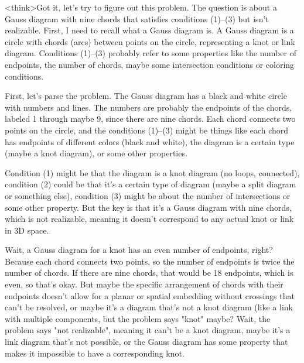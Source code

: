 <think>Got it, let's try to figure out this problem. The question is about a Gauss diagram with nine chords that satisfies conditions (1)--(3) but isn't realizable. First, I need to recall what a Gauss diagram is. A Gauss diagram is a circle with chords (arcs) between points on the circle, representing a knot or link diagram. Conditions (1)--(3) probably refer to some properties like the number of endpoints, the number of chords, maybe some intersection conditions or coloring conditions.

First, let's parse the problem. The Gauss diagram has a black and white circle with numbers and lines. The numbers are probably the endpoints of the chords, labeled 1 through maybe 9, since there are nine chords. Each chord connects two points on the circle, and the conditions (1)--(3) might be things like each chord has endpoints of different colors (black and white), the diagram is a certain type (maybe a knot diagram), or some other properties.

Condition (1) might be that the diagram is a knot diagram (no loops, connected), condition (2) could be that it's a certain type of diagram (maybe a split diagram or something else), condition (3) might be about the number of intersections or some other property. But the key is that it's a Gauss diagram with nine chords, which is not realizable, meaning it doesn't correspond to any actual knot or link in 3D space.

Wait, a Gauss diagram for a knot has an even number of endpoints, right? Because each chord connects two points, so the number of endpoints is twice the number of chords. If there are nine chords, that would be 18 endpoints, which is even, so that's okay. But maybe the specific arrangement of chords with their endpoints doesn't allow for a planar or spatial embedding without crossings that can't be resolved, or maybe it's a diagram that's not a knot diagram (like a link with multiple components, but the problem says "knot" maybe? Wait, the problem says "not realizable", meaning it can't be a knot diagram, maybe it's a link diagram that's not possible, or the Gauss diagram has some property that makes it impossible to have a corresponding knot.

